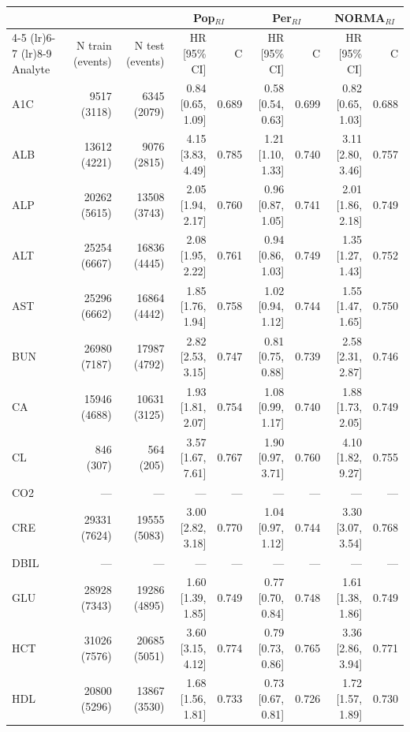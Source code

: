 \begin{table}[ht]
\centering
\footnotesize
\begin{tabular}{lrrrrrrrr}
\toprule
 & &  & \multicolumn{2}{c}{Pop$_{RI}$} & \multicolumn{2}{c}{Per$_{RI}$} & \multicolumn{2}{c}{NORMA$_{RI}$} \\
\cmidrule(lr){4-5} \cmidrule(lr){6-7} \cmidrule(lr){8-9}
Analyte & N train (events) & N test (events) & HR [95\% CI] & C & HR [95\% CI] & C & HR [95\% CI] & C \\
\midrule
A1C & 9517 (3118) & 6345 (2079) & 0.84 [0.65, 1.09] & 0.689 & 0.58 [0.54, 0.63] & 0.699 & 0.82 [0.65, 1.03] & 0.688 \\
ALB & 13612 (4221) & 9076 (2815) & 4.15 [3.83, 4.49] & 0.785 & 1.21 [1.10, 1.33] & 0.740 & 3.11 [2.80, 3.46] & 0.757 \\
ALP & 20262 (5615) & 13508 (3743) & 2.05 [1.94, 2.17] & 0.760 & 0.96 [0.87, 1.05] & 0.741 & 2.01 [1.86, 2.18] & 0.749 \\
ALT & 25254 (6667) & 16836 (4445) & 2.08 [1.95, 2.22] & 0.761 & 0.94 [0.86, 1.03] & 0.749 & 1.35 [1.27, 1.43] & 0.752 \\
AST & 25296 (6662) & 16864 (4442) & 1.85 [1.76, 1.94] & 0.758 & 1.02 [0.94, 1.12] & 0.744 & 1.55 [1.47, 1.65] & 0.750 \\
BUN & 26980 (7187) & 17987 (4792) & 2.82 [2.53, 3.15] & 0.747 & 0.81 [0.75, 0.88] & 0.739 & 2.58 [2.31, 2.87] & 0.746 \\
CA & 15946 (4688) & 10631 (3125) & 1.93 [1.81, 2.07] & 0.754 & 1.08 [0.99, 1.17] & 0.740 & 1.88 [1.73, 2.05] & 0.749 \\
CL & 846 (307) & 564 (205) & 3.57 [1.67, 7.61] & 0.767 & 1.90 [0.97, 3.71] & 0.760 & 4.10 [1.82, 9.27] & 0.755 \\
CO2 & --- & --- & --- & --- & --- & --- & --- & --- \\
CRE & 29331 (7624) & 19555 (5083) & 3.00 [2.82, 3.18] & 0.770 & 1.04 [0.97, 1.12] & 0.744 & 3.30 [3.07, 3.54] & 0.768 \\
DBIL & --- & --- & --- & --- & --- & --- & --- & --- \\
GLU & 28928 (7343) & 19286 (4895) & 1.60 [1.39, 1.85] & 0.749 & 0.77 [0.70, 0.84] & 0.748 & 1.61 [1.38, 1.86] & 0.749 \\
HCT & 31026 (7576) & 20685 (5051) & 3.60 [3.15, 4.12] & 0.774 & 0.79 [0.73, 0.86] & 0.765 & 3.36 [2.86, 3.94] & 0.771 \\
HDL & 20800 (5296) & 13867 (3530) & 1.68 [1.56, 1.81] & 0.733 & 0.73 [0.67, 0.81] & 0.726 & 1.72 [1.57, 1.89] & 0.730 \\

\end{tabular}
\end{table}
